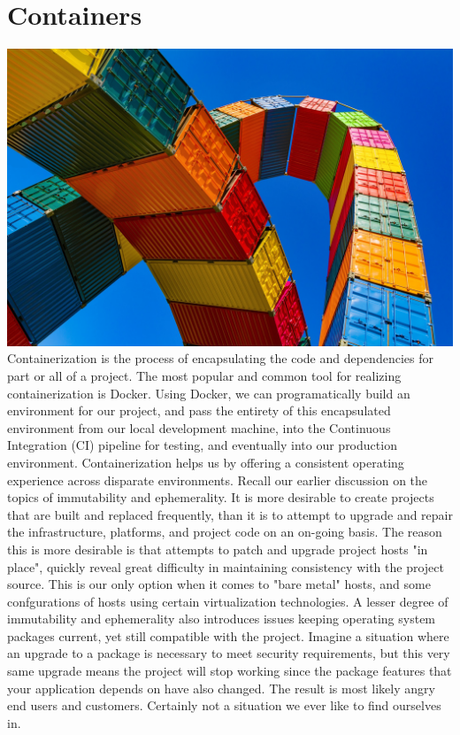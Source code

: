 \chapter{Containers}
\includegraphics[scale=0.85]{../images/container-4203677_1920.jpg}
\justify
Containerization is the process of encapsulating the
code and dependencies for part or all of a project. 
The most popular and common tool for realizing
containerization is Docker. Using Docker,
we can programatically build an environment for our project,
and pass the entirety of this encapsulated environment
from our local development machine, into the
Continuous Integration (CI)
pipeline for testing, and eventually into our production
environment. Containerization
helps us by offering a consistent operating experience
across disparate environments.
\justify
Recall our earlier discussion on the topics of immutability
and ephemerality. 
It is more desirable to create projects that are built
and replaced frequently, than it is to attempt to upgrade
and repair the infrastructure, platforms, and project code
on an on-going basis. The reason this is more desirable 
is that attempts to patch and upgrade project
hosts "in place", quickly reveal great difficulty in maintaining consistency
with the project source. This is our only option when it comes 
to "bare metal" hosts, and some confgurations of hosts using
certain virtualization technologies. A lesser degree of immutability
and ephemerality also introduces issues keeping
operating system packages current, yet still compatible with
the project. Imagine a situation where an upgrade to a package
is necessary to meet security requirements, but this very same
upgrade means the project will stop working since the package
features that your application depends on have also changed.
The result is most likely angry end users and customers. 
Certainly not a situation we ever like to find ourselves in.


